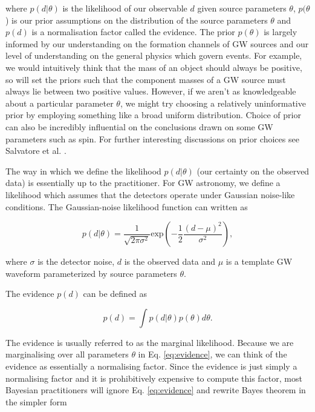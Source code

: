 %
%
where $p(d|\theta)$ is the likelihood of our observable $d$ given source parameters $\theta$, $p(\theta$) is our prior assumptions on the distribution of the source parameters $\theta$ and $p(d)$ is a normalisation factor called the evidence. The prior $p(\theta)$ is largely informed by our understanding on the formation channels of \ac{GW} sources and our level of understanding on the general physics which govern events. For example, we would intuitively think that the mass of an object should always be positive, so will set the priors such that the component masses of a \ac{GW} source must always lie between two positive values. However, if we aren't as knowledgeable about a particular parameter $\theta$, we might try choosing a relatively uninformative prior by employing something like a broad uniform distribution. Choice of prior can also be incredibly influential on the conclusions drawn on some \ac{GW} parameters such as spin. For further interesting discussions on prior choices see Salvatore et al. \cite{PhysRevLett.119.251103}.

%
%
The way in which we define the likelihood $p(d|\theta)$ (our certainty on the observed data) is essentially up to the practitioner. For \ac{GW} astronomy, we define a likelihood which assumes that the detectors operate under Gaussian noise-like conditions. The Gaussian-noise likelihood function can written as 

\begin{equation}
    p(d|\theta) = \frac{1}{\sqrt{2\pi \sigma^2}} \textrm{exp}\left(-\frac{1}{2} 
    \frac{(d - \mu)^2}{\sigma^2}\right),
\end{equation}

where $\sigma$ is the detector noise, $d$ is the observed data and $\mu$ is a template \ac{GW} waveform parameterized by source parameters $\theta$. 

%
%
The evidence $p(d)$ can be defined as 

\begin{equation}
    p(d) = \int p(d|\theta) p(\theta) d\theta.
    \label{eq:evidence}
\end{equation}

The evidence is usually referred to as the marginal likelihood. Because we are marginalising over all parameters $\theta$ in Eq. \ref{eq:evidence}, we can think of the evidence as essentially a normalising factor. Since the evidence is just simply a normalising factor and it is prohibitively expensive to compute this factor, most Bayesian practitioners will ignore Eq. \ref{eq:evidence} and rewrite Bayes theorem in the simpler form 

